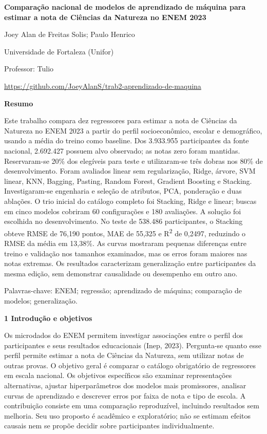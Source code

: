 \documentclass[12pt,a4paper]{article}
\newcommand{\heading}[1]{\par\Needspace{4\baselineskip}\noindent\textbf{#1}\par\vspace{5pt}}
\begin{document}
\begin{center}\textbf{Comparação nacional de modelos de aprendizado de máquina para estimar a nota de Ciências da Natureza no ENEM 2023}\end{center}
\begingroup\singlespacing\centering Joey Alan de Freitas Solis; Paulo Henrico\par\endgroup
\begingroup\singlespacing\centering Universidade de Fortaleza (Unifor)\par\endgroup
\begingroup\singlespacing\centering Professor: Tulio\par\endgroup
\begingroup\singlespacing\centering \url{https://github.com/JoeyAlanS/trab2-aprendizado-de-maquina}\par\endgroup
\begin{center}\textbf{Resumo}\end{center}
\begingroup\singlespacing\noindent Este trabalho compara dez regressores para estimar a nota de Ciências da Natureza no ENEM 2023 a partir do perfil socioeconômico, escolar e demográfico, usando a média do treino como baseline. Dos 3.933.955 participantes da fonte nacional, 2.692.427 possuem alvo observado; as notas zero foram mantidas. Reservaram-se 20\% dos elegíveis para teste e utilizaram-se três dobras nos 80\% de desenvolvimento. Foram avaliados linear sem regularização, Ridge, árvore, SVM linear, KNN, Bagging, Pasting, Random Forest, Gradient Boosting e Stacking. Investigaram-se engenharia e seleção de atributos, PCA, ponderação e duas ablações. O trio inicial do catálogo completo foi Stacking, Ridge e linear; buscas em cinco modelos cobriram 60 configurações e 180 avaliações. A solução foi escolhida no desenvolvimento. No teste de 538.486 participantes, o Stacking obteve RMSE de 76,190 pontos, MAE de 55,325 e R\textsuperscript{2} de 0,2497, reduzindo o RMSE da média em 13,38\%. As curvas mostraram pequenas diferenças entre treino e validação nos tamanhos examinados, mas os erros foram maiores nas notas extremas. Os resultados caracterizam generalização entre participantes da mesma edição, sem demonstrar causalidade ou desempenho em outro ano.\par\endgroup\vspace{6pt}
\begingroup\singlespacing\noindent Palavras-chave: ENEM; regressão; aprendizado de máquina; comparação de modelos; generalização.\par\endgroup
\heading{1 Introdução e objetivos}
Os microdados do ENEM permitem investigar associações entre o perfil dos participantes e seus resultados educacionais (Inep, 2023). Pergunta-se quanto esse perfil permite estimar a nota de Ciências da Natureza, sem utilizar notas de outras provas. O objetivo geral é comparar o catálogo obrigatório de regressores em escala nacional. Os objetivos específicos são examinar representações alternativas, ajustar hiperparâmetros dos modelos mais promissores, analisar curvas de aprendizado e descrever erros por faixa de nota e tipo de escola. A contribuição consiste em uma comparação reproduzível, incluindo resultados sem melhoria. Seu uso proposto é acadêmico e exploratório; não se estimam efeitos causais nem se propõe decidir sobre participantes individualmente.
\end{document}
